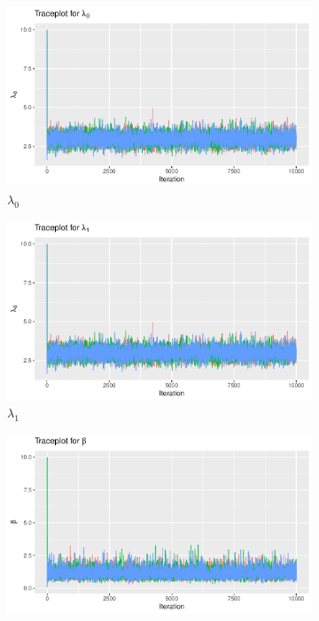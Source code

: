 
\begin{figure}[H]
    \centering
    \begin{subfigure}[b]{0.49\textwidth}
        \centering
        \includegraphics[width = \textwidth]{Images/mixing_lambda_0_block.pdf}
        \caption{$\lambda_0$ }
        \label{fig:sim_mixing_lam0}
    \end{subfigure}
    \begin{subfigure}[b]{0.49\textwidth}
        \centering
        \includegraphics[width = \textwidth]{Images/mixing_lambda_1_block.pdf}
        \caption{$\lambda_1$}
        \label{fig:sim_mixing_lam1}
    \end{subfigure}
    \begin{subfigure}[b]{0.49\textwidth}
        \centering
        \includegraphics[width = \textwidth]{Images/mixing_beta_block.pdf}

\end{subfigure}
\end{figure}
